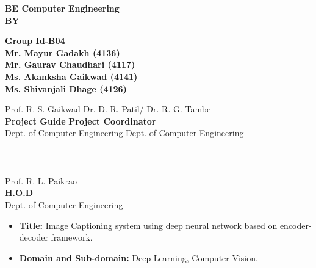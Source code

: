 \documentclass[12pt]{report}	%
\begin{document}
{\begin{center}
\bf {BE Computer Engineering}\\
BY
\end{center}
{\begin{center}
\textbf{Group Id-B04}\\
\textbf{Mr. Mayur Gadakh  (4136)}\\
\textbf{Mr. Gaurav Chaudhari  (4117)}\\
\textbf{Ms. Akanksha Gaikwad (4141)}\\
\textbf{Ms. Shivanjali Dhage (4126)}\\
\end{center}


\vspace*{0.6in}
\hspace*{0.0in}Prof. R. S. Gaikwad\hspace{1.8in} Dr. D. R. Patil/ Dr. R. G. Tambe\\
\hspace*{0.3in} \textbf{Project Guide} \hspace{2.3in} \textbf{Project Coordinator}\\
Dept. of Computer Engineering \hspace{1.2in} Dept. of Computer Engineering\\
\\
\\
\\
\hspace*{2.3in}Prof. R. L. Paikrao\\
\hspace*{2.7in} \textbf{H.O.D}\\
\hspace*{1.9in}Dept. of Computer Engineering 
\\


\newpage
{} 

\begin{itemize}

\item{\textbf{Title:} Image Captioning system using deep neural network based on encoder-decoder framework.} 

\item{\textbf{Domain and Sub-domain:} Deep Learning, Computer Vision.} 


\end{itemize}}}
\end{document}
